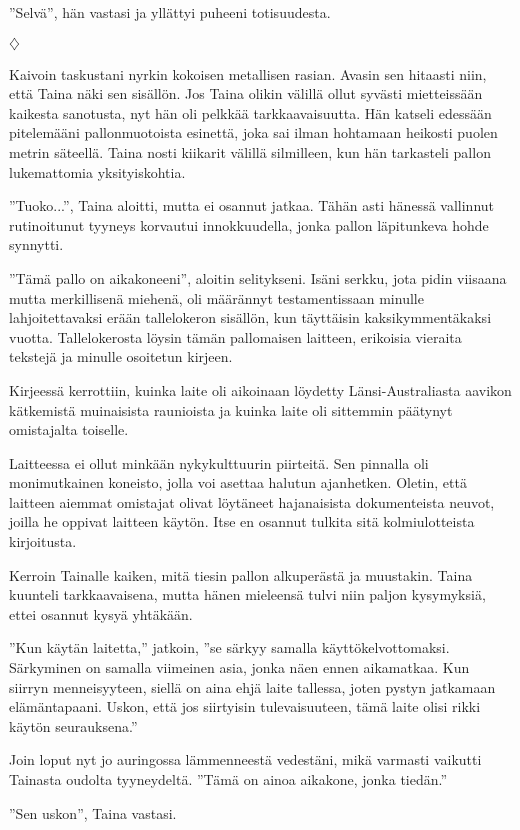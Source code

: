 ﻿\documentclass[a4paper, 12pt, finnish]{article}
\newcommand{\q}[1]{''#1''}
\def\jump{\vspace{2mm} \centerline{$\diamondsuit$} \vspace{2mm}}
\begin{document}
\q{Selvä}, hän vastasi ja yllättyi puheeni totisuudesta.


\jump


Kaivoin taskustani nyrkin kokoisen metallisen rasian. Avasin sen
hitaasti niin, että Taina näki sen sisällön. Jos Taina olikin välillä
ollut syvästi mietteissään kaikesta sanotusta, nyt hän oli
pelkkää tarkkaavaisuutta. Hän katseli edessään pitelemääni
pallonmuotoista esinettä, joka sai ilman hohtamaan heikosti
puolen metrin säteellä. Taina nosti kiikarit välillä silmilleen,
kun hän tarkasteli pallon lukemattomia yksityiskohtia.

\q{Tuoko...}, Taina aloitti, mutta ei osannut jatkaa.
Tähän asti hänessä vallinnut rutinoitunut tyyneys
korvautui innokkuudella, jonka pallon läpitunkeva hohde synnytti.

\q{Tämä pallo on aikakoneeni}, aloitin selitykseni.
Isäni serkku, jota pidin viisaana mutta merkillisenä
miehenä, oli määrännyt testamentissaan minulle
lahjoitettavaksi erään tallelokeron sisällön,
kun täyttäisin kaksikymmentäkaksi vuotta. Tallelokerosta
löysin tämän pallomaisen laitteen, erikoisia vieraita
tekstejä ja minulle osoitetun kirjeen.

Kirjeessä kerrottiin, kuinka laite oli aikoinaan löydetty
Länsi-Australiasta aavikon kätkemistä muinaisista raunioista
ja kuinka laite oli sittemmin päätynyt omistajalta toiselle.

Laitteessa ei ollut minkään nykykulttuurin piirteitä.
Sen pinnalla oli monimutkainen koneisto,
jolla voi asettaa halutun ajanhetken. Oletin,
että laitteen aiemmat omistajat olivat löytäneet hajanaisista
dokumenteista neuvot, joilla he oppivat laitteen käytön.
Itse en osannut tulkita sitä kolmiulotteista kirjoitusta.

Kerroin Tainalle kaiken, mitä tiesin pallon alkuperästä ja muustakin.
Taina kuunteli tarkkaavaisena, mutta hänen mieleensä tulvi niin paljon
kysymyksiä, ettei osannut kysyä yhtäkään.

\q{Kun käytän laitetta,} jatkoin, \q{se särkyy samalla käyttökelvottomaksi.
Särkyminen on samalla viimeinen asia, jonka näen ennen aikamatkaa.
Kun siirryn menneisyyteen, siellä on aina ehjä laite tallessa,
joten pystyn jatkamaan elämäntapaani. Uskon, että jos siirtyisin
tulevaisuuteen, tämä laite olisi rikki käytön seurauksena.}

Join loput nyt jo auringossa lämmenneestä vedestäni,
mikä varmasti vaikutti Tainasta oudolta tyyneydeltä.
\q{Tämä on ainoa aikakone, jonka tiedän.}

\q{Sen uskon}, Taina vastasi.
\end{document}
